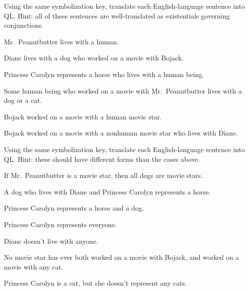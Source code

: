\solutions
\problempart
\label{pr.QLbojacksome}
Using the same symbolization key, translate each English-language sentence into QL. Hint: all of these sentences are well-translated as existentials governing conjunctions.
\begin{earg}
\item Mr.\ Peanutbutter lives with a human.
\item Diane lives with a dog who worked on a movie with Bojack.
\item Princess Carolyn represents a horse who lives with a human being.
\item Some human being who worked on a movie with Mr.\ Peanutbutter lives with a dog or a cat.
\item Bojack worked on a movie with a human movie star.
\item Bojack worked on a movie with a nonhuman movie star who lives with Diane.
\end{earg}

\problempart
\label{pr.QLbojackother}
Using the same symbolization key, translate each English-language sentence into QL. Hint: these should have different forms than the cases above.
\begin{earg}
\item If Mr.\ Peanutbutter is a movie star, then all dogs are movie stars.
\item A dog who lives with Diane and Princess Carolyn represents a horse.
\item Princess Carolyn represents a horse and a dog.
\item Princess Carolyn represents everyone.
\item Diane doesn't live with anyone.
\item No movie star has ever both worked on a movie with Bojack, and worked on a movie with any cat.
\item Princess Carolyn is a cat, but she doesn't represent any cats.
\end{earg}



